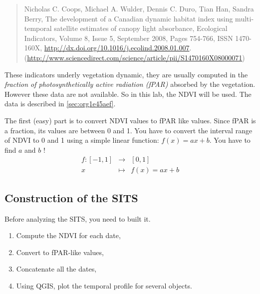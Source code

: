 \documentclass[a4paper,11pt,DIV=18]{scrartcl}
\begin{document}
\begin{quote}
Nicholas C. Coops, Michael A. Wulder, Dennis C. Duro, Tian Han, Sandra
Berry,  The development  of  a Canadian  dynamic  habitat index  using
multi-temporal  satellite   estimates  of  canopy   light  absorbance,
Ecological  Indicators,  Volume  8,  Issue 5,  September  2008,  Pages
754-766,                        ISSN                        1470-160X,
\url{http://dx.doi.org/10.1016/j.ecolind.2008.01.007}.
(\url{http://www.sciencedirect.com/science/article/pii/S1470160X08000071})
\end{quote}

These indicators underly vegetation dynamic, they are usually computed
in the \emph{fraction of photosynthetically active radiation (fPAR)} absorbed
by the vegetation.  However these data  are not available.  So in this
lab, the NDVI will be used. The data is described in \ref{sec:org1e45aef}.


\begin{work}
The first (easy)  part is to convert NDVI values  to fPAR like values.
Since fPAR is a fraction, its values  are between 0 and 1. You have to
convert the interval  range of NDVI to  0 and 1 using  a simple linear
function: \(f(x)=ax+b\). You have to find \(a\) and \(b\) !
\begin{eqnarray*}
  f:[-1,1] &\to& [0,1]\\
  x&\mapsto&f(x)=ax+b
\end{eqnarray*}
\end{work}

\subsection{Construction of the SITS}
\label{sec:org4568c0a}
Before analyzing the  SITS, you need to built it.   
\begin{work}
\begin{enumerate}
\item Compute the NDVI for each date,
\item Convert to fPAR-like values,
\item Concatenate all the dates,
\item Using QGIS,  plot the  temporal  profile for  several objects.
\end{enumerate}
\end{work}
\end{document}
